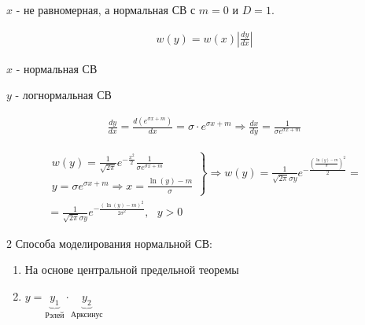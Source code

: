 \documentclass[14pt,a4paper,oneside]{extarticle}
\begin{document}
$x$ - не равномерная, а нормальная СВ с $m=0$ и $D=1$.

\begin{gather*}
    w(y)=w(x)\left\lvert \frac{d y}{d x} \right\rvert
\end{gather*}

$x$ - нормальная СВ

$y$ - логнормальная СВ

\begin{gather*}
    \frac{dy}{dx}=\frac{d\left( e^{\sigma x+m} \right)}{dx}=\sigma\cdot e^{\sigma x+m} \Longrightarrow \frac{d x}{d y}=\frac{1}{\sigma e^{\sigma x+m}}
\end{gather*}

\begin{gather*}
    \left.
    \begin{array}{cc}
        w(y) = \frac{1}{\sqrt{2\pi}}e^{-\frac{x^2}{2}}\frac{1}{\sigma e^{\sigma x+m}} \\
        y=\sigma e^{\sigma x+m}\Longrightarrow x=\frac{\ln(y)-m}{\sigma}
    \end{array}
    \right\} \Longrightarrow w(y)=\frac{1}{\sqrt{2\pi}\sigma y}e^{-\frac{\left(\frac{\ln(y)-m}{\sigma}\right)^2 }{2}}=\\=\frac{1}{\sqrt{2\pi}\sigma y}e^{-\frac{(\ln(y)-m)^2}{2\sigma^2}},\text{ } y>0
\end{gather*}

2 Способа моделирования нормальной СВ:

\begin{enumerate}
    \item На основе центральной предельной теоремы
    \item $y=\underbrace{y_1}_{\text{Рэлей}} \cdot \underbrace{y_2}_{\text{Арксинус}} $
\end{enumerate}
\end{document}

